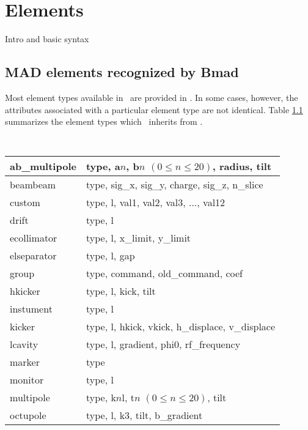 \chapter{Elements}

Intro and basic syntax

\section{MAD elements recognized by Bmad}
Most element types available in \mad\ are provided in \bmad.  In some cases, however, the attributes
associated with a particular element type are not identical.  Table \ref{tab:mad_elements} summarizes the
element types which \bmad\ inherits from \mad.

\begin{table}
\label{tab:mad_elements}\center
{\tt
\begin{tabular}{|l|l|} \hline
    ab\_multipole &  type, a$n$, b$n$ $(0 \le n \le 20)$, radius, tilt     \\ \hline
    beambeam      &  type, sig\_x, sig\_y, charge, sig\_z, n\_slice        \\ \hline
    custom        &  type, l, val1, val2, val3, ..., val12                 \\ \hline
    drift         &  type, l                                               \\ \hline
    ecollimator   &  type, l, x\_limit, y\_limit                           \\ \hline
    elseparator   &  type, l, gap                                          \\ \hline
    group         &  type, command, old\_command, coef                     \\ \hline
    hkicker       &  type, l, kick, tilt                                   \\ \hline
    instument     &  type, l                                               \\ \hline
    kicker        &  type, l, hkick, vkick, h\_displace, v\_displace       \\ \hline
    lcavity       &  type, l, gradient, phi0, rf\_frequency \\ \hline
    marker        &  type \\ \hline
    monitor       &  type, l \\ \hline
    multipole     &  type, k$n$l, t$n$ $(0 \le n \le 20)$, tilt \\ \hline
    octupole      &  type, l, k3, tilt, b\_gradient \\ \hline

\end{tabular}}
\end{table}
